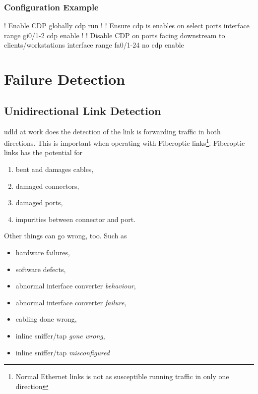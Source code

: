 \subsubsection*{Configuration Example}

\begin{cisco}
! Enable CDP globally
cdp run
!
! Ensure cdp is enables on select ports
interface range gi0/1-2
 cdp enable
!
! Disable CDP on ports facing downstream to clients/workstations
interface range fa0/1-24
 no cdp enable
\end{cisco}

\section{Failure Detection}

\subsection[UDLD]{Unidirectional Link Detection}

\gls{udld} at work does the detection of the link is forwarding traffic in both directions. This is important when operating with Fiberoptic links\footnote{Normal Ethernet links is not as susceptible running traffic in only one direction}. Fiberoptic links has the potential for
\begin{enumerate}
    \item bent and damages cables,
    \item damaged connectors,
    \item damaged ports,
    \item impurities between connector and port.
\end{enumerate}


Other things can go wrong, too. Such as
\begin{itemize}
    \item hardware failures,
    \item software defects,
    \item abnormal interface converter \textit{behaviour},
    \item abnormal interface converter \textit{failure},
    \item cabling done wrong,
    \item inline sniffer/tap \textit{gone wrong},
    \item inline sniffer/tap \textit{misconfigured}
\end{itemize}

